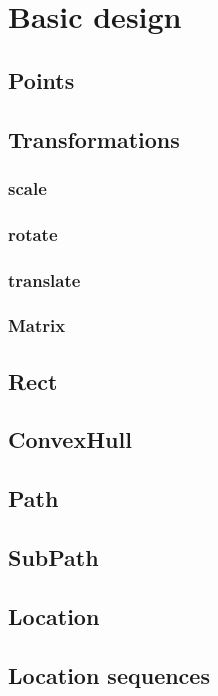 


\chapter{Basic design}

\section{Points}

\section{Transformations}
\subsection{scale}
\subsection{rotate}
\subsection{translate}
\subsection{Matrix}

\section{Rect}

\section{ConvexHull}

\section{Path}

\section{SubPath}

\section{Location}

\section{Location sequences}

